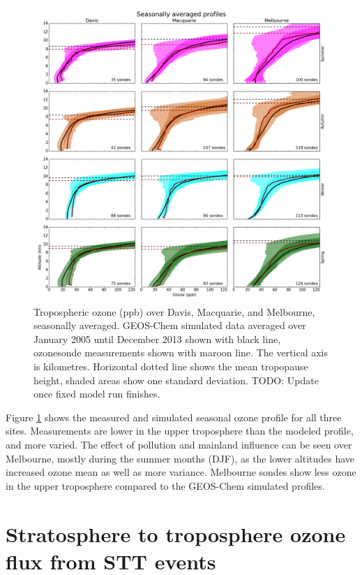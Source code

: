 \documentclass{article}
\begin{document}
  \begin{figure}[!htbp]
    \includegraphics[width=\textwidth]{figures/seasonalprofiles00.png}
    \caption{Tropospheric ozone (ppb) over Davis, Macquarie, and Melbourne, seasonally averaged.
    GEOS-Chem simulated data averaged over January 2005 until December 2013 shown with black line, ozonesonde measurements shown with maroon line.
    The vertical axis is kilometres.
    Horizontal dotted line shows the mean tropopause height, shaded areas show one standard deviation.
    TODO: Update once fixed model run finishes.}
    \label{fig:GEOSChemSeasonalProfiles}
  \end{figure}
  
  Figure \ref{fig:GEOSChemSeasonalProfiles} shows the measured and simulated seasonal ozone profile for all three sites.
  Measurements are lower in the upper troposphere than the modeled profile, and more varied.
  The effect of pollution and mainland influence can be seen over Melbourne, mostly during the summer months (DJF), as the lower altitudes have increased ozone mean as well as more variance.
  Melbourne sondes show less ozone in the upper troposphere compared to the GEOS-Chem simulated profiles.
    
  
\section{Stratosphere to troposphere ozone flux from STT events}
  
\end{document}
